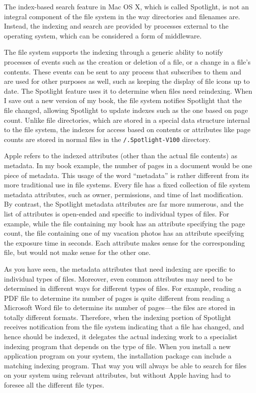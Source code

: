 The index-based search feature in Mac OS X, which is called Spotlight,
is not an integral component of the file system in the way directories
and filenames are.  Instead, the indexing and search are provided by
processes external to the operating system, which can be considered a
form of middleware.

The file system supports the indexing through a generic ability to
notify processes of events such as the creation or deletion of a file,
or a change in a file's contents.  These events can be sent to any
process that subscribes to them and are used for other purposes as
well, such as keeping the display of file icons up to date.  The
Spotlight feature uses it to determine when files need reindexing.
When I save out a new version of my book, the file system
notifies Spotlight that the file changed, allowing Spotlight to update
indexes such as the one based on page count.  Unlike file directories,
which are stored in a special data structure internal to the
file system, the indexes for access based on contents or attributes
like page counts are stored in normal files in the
\verb|/.Spotlight-V100| directory.

Apple refers to the indexed attributes (other than the actual file
contents) as metadata.  In my book example, the number of pages in a
document would be one piece of metadata.  This usage of the word
``metadata'' is rather different from its more traditional use in
file systems.  Every file has a fixed collection of file system metadata
attributes, such as owner, permissions, and time of last modification.
By contrast, the Spotlight metadata attributes are far more numerous,
and the list of attributes is open-ended and specific to
individual types of files.  For example, while the file containing my
book has an attribute specifying the page count, the file containing one of my
vacation photos has an attribute specifying the exposure time in
seconds.
Each attribute makes sense for the corresponding
file, but would not make sense for the other one.

As you have seen, the metadata attributes that need indexing are
specific to individual types of files.  Moreover, even common
attributes may need to be determined in different ways for different
types of files.  For example, reading a PDF file to determine its
number of pages is quite different from reading a Microsoft Word file
to determine its number of pages---the files are stored in totally
different formats.  Therefore, when the indexing portion of Spotlight
receives notification from the file system indicating that a file has
changed, and hence should be indexed, it delegates the actual indexing
work to a specialist indexing program that depends on the type of
file.  When you install a new application program on your system, the
installation package can include a matching indexing program.  That
way you will always be able to search for files on your system using
relevant attributes, but without Apple having had to foresee all the
different file types.

